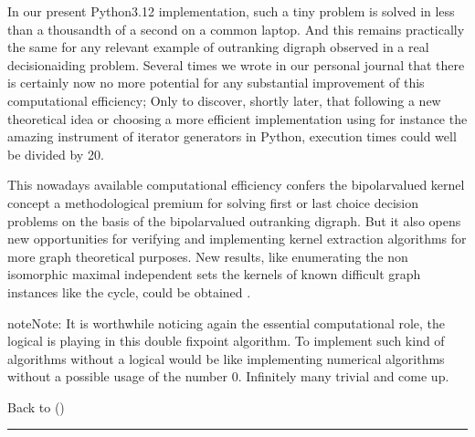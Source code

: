\documentclass[a4paper,12pt,english]{sphinxhowto}
\begin{document}
\sphinxAtStartPar
In our present Python3.12 implementation, such a tiny problem is solved in less than a thousandth of a second on a common laptop. And this remains practically the same for any relevant example of outranking digraph observed in a real decision\sphinxhyphen{}aiding problem. Several times we wrote in our personal journal that there is certainly now no more potential for any substantial improvement of this computational efficiency; Only to discover, shortly later, that following a new theoretical idea or choosing a more efficient implementation \textendash{}\sphinxhyphen{}using for instance the amazing instrument of iterator generators in Python\textendash{}\sphinxhyphen{}, execution times could well be divided by 20.

\sphinxAtStartPar
This nowadays available computational efficiency confers the bipolar\sphinxhyphen{}valued kernel concept a methodological premium for solving first or last choice decision problems on the basis of the bipolar\sphinxhyphen{}valued outranking digraph. But it also opens new opportunities for verifying and implementing kernel extraction algorithms for more graph theoretical purposes. New results, like enumerating the non isomorphic maximal independent sets \textendash{}the kernels\textendash{} of known difficult graph instances like the \sphinxhyphen{}cycle, could be obtained .

\begin{sphinxadmonition}{note}{Note:}
\sphinxAtStartPar
It is worthwhile noticing again the essential computational role, the logical  is playing in this double fixpoint algorithm. To implement such kind of algorithms without a logical  would be like implementing numerical algorithms without a possible usage of the number 0. Infinitely many trivial  and  come up.
\end{sphinxadmonition}

\sphinxAtStartPar
Back to {\hyperref[\detokenize{pearls:pearls-label}]{}} ()


\bigskip\hrule\bigskip
\end{document}
